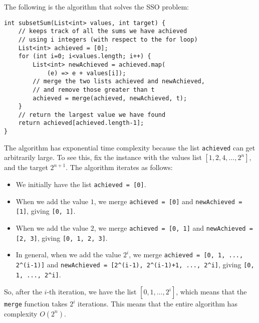\documentclass[a4paper, openany]{memoir}
\begin{document}
    The following is the algorithm that solves the SSO problem:
\begin{lstlisting}[language=pseudocode]
int subsetSum(List<int> values, int target) {
    // keeps track of all the sums we have achieved 
    // using i integers (with respect to the for loop)
    List<int> achieved = [0];
    for (int i=0; i<values.length; i++) {
        List<int> newAchieved = achieved.map(
            (e) => e + values[i]);
        // merge the two lists achieved and newAchieved,
        // and remove those greater than t
        achieved = merge(achieved, newAchieved, t);
    }
    // return the largest value we have found
    return achieved[achieved.length-1];
}
\end{lstlisting}
    \noindent The algorithm has exponential time complexity because the list \texttt{achieved} can get arbitrarily large. To see this, fix the instance with the values list $[1, 2, 4, \dots, 2^n]$, and the target $2^{n+1}$. The algorithm iterates as follows:
    \begin{itemize}
        \item We initially have the list \texttt{achieved = [0]}.
        \item When we add the value $1$, we merge \texttt{achieved = [0]} and \texttt{newAchieved = [1]}, giving \texttt{[0, 1]}.
        \item When we add the value $2$, we merge \texttt{achieved = [0, 1]} and \texttt{newAchieved = [2, 3]}, giving \texttt{[0, 1, 2, 3]}.
        \item In general, when we add the value $2^i$, we merge \texttt{achieved = [0, 1, ..., 2\textasciicircum(i-1)]} and \texttt{newAchieved = [2\textasciicircum(i-1), 2\textasciicircum(i-1)+1, ..., 2\textasciicircum i]}, giving \texttt{[0, 1, ..., 2\textasciicircum i]}.
    \end{itemize}
    So, after the $i$-th iteration, we have the list $[0, 1, \dots, 2^i]$, which means that the \texttt{merge} function takes $2^i$ iterations. This means that the entire algorithm has complexity $O(2^n)$. 
    
\end{document}
